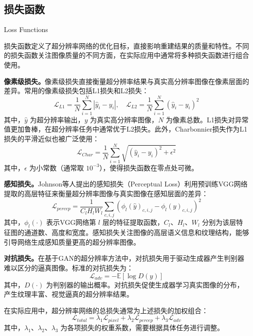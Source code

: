 \subsection{损失函数}{Loss Functions}

损失函数定义了超分辨率网络的优化目标，直接影响重建结果的质量和特性。不同的损失函数关注图像质量的不同方面，在实际应用中通常将多种损失函数进行组合使用。

\textbf{像素级损失。}像素级损失直接衡量超分辨率结果与真实高分辨率图像在像素层面的差异。常用的像素级损失包括L1损失和L2损失：
\begin{equation}
  \mathcal{L}_{L1} = \frac{1}{N}\sum_{i=1}^{N}|\hat{y}_i - y_i|, \quad
  \mathcal{L}_{L2} = \frac{1}{N}\sum_{i=1}^{N}(\hat{y}_i - y_i)^2
  \label{eq:pixel_loss}
\end{equation}
其中，$\hat{y}$ 为超分辨率输出，$y$ 为真实高分辨率图像，$N$ 为像素总数。L1损失对异常值更加鲁棒，在超分辨率任务中通常优于L2损失。此外，Charbonnier损失作为L1损失的平滑近似也被广泛使用：
\begin{equation}
  \mathcal{L}_{Char} = \frac{1}{N}\sum_{i=1}^{N}\sqrt{(\hat{y}_i - y_i)^2 + \epsilon^2}
  \label{eq:charbonnier_loss}
\end{equation}
其中，$\epsilon$ 为小常数（通常取 $10^{-3}$），使得损失函数在零点处可微。

\textbf{感知损失。}Johnson等人提出的感知损失（Perceptual Loss）\cite{johnson2016perceptual}利用预训练VGG网络\cite{simonyan2014very}提取的高层特征来衡量超分辨率图像与真实图像在感知层面的差异：
\begin{equation}
  \mathcal{L}_{percep} = \frac{1}{C_l H_l W_l}\sum_{c,i,j}\left(\phi_l(\hat{y})_{c,i,j} - \phi_l(y)_{c,i,j}\right)^2
  \label{eq:perceptual_loss}
\end{equation}
其中，$\phi_l(\cdot)$ 表示VGG网络第 $l$ 层的特征提取函数，$C_l$、$H_l$、$W_l$ 分别为该层特征图的通道数、高度和宽度。感知损失关注图像的高层语义信息和纹理结构，能够引导网络生成感知质量更高的超分辨率图像。

\textbf{对抗损失。}在基于GAN的超分辨率方法中，对抗损失用于驱动生成器产生判别器难以区分的逼真图像。标准的对抗损失为：
\begin{equation}
  \mathcal{L}_{adv} = -\mathbb{E}[\log D(\hat{y})]
  \label{eq:adversarial_loss}
\end{equation}
其中，$D(\cdot)$ 为判别器的输出概率。对抗损失促使生成器学习真实图像的分布，产生纹理丰富、视觉逼真的超分辨率结果。

在实际应用中，超分辨率网络的总损失通常为上述损失的加权组合：
\begin{equation}
  \mathcal{L}_{total} = \lambda_1\mathcal{L}_{pixel} + \lambda_2\mathcal{L}_{percep} + \lambda_3\mathcal{L}_{adv}
  \label{eq:total_loss}
\end{equation}
其中，$\lambda_1$、$\lambda_2$、$\lambda_3$ 为各项损失的权重系数，需要根据具体任务进行调整。

